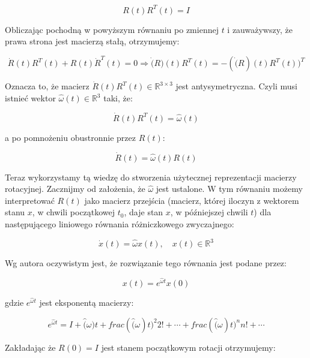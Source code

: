 \documentclass[a4paper,12pt]{article}
\newcommand{\RR}{\mathbb{R}^3}
\newcommand{\RRR}{\mathbb{R}^{3 \times 3}}
\begin{document}
\begin{equation}
R(t)R^T(t)=I
\end{equation}

Obliczając pochodną w powyższym równaniu po zmiennej $t$ i zauważywszy, że prawa strona jest macierzą stałą, otrzymujemy:

\begin{equation}
\dot{R}(t)R^T(t) + R(t)\dot{R}^T(t)=0 \Rightarrow \dot(R)(t)R^T(t)=-(\dot(R)(t)R^T(t))^T
\end{equation}

Oznacza to, że macierz $\dot{R}(t)R^T(t) \in \RRR$ jest antysymetryczna. Czyli musi istnieć wektor $\hat{\omega}(t) \in \RR$ taki, że:

\begin{equation}
\dot{R}(t)R^T(t) = \hat{\omega}(t)
\end{equation}

\noindent a po pomnożeniu obustronnie przez $R(t)$:

\begin{equation}
\dot{R}(t) = \hat{\omega}(t)R(t)
\end{equation}

Teraz wykorzystamy tą wiedzę do stworzenia użytecznej reprezentacji macierzy rotacyjnej. Zacznijmy od założenia, że $\hat{\omega}$ jest ustalone. W tym równaniu możemy interpretować $R(t)$ jako macierz przejścia (macierz, której iloczyn z wektorem stanu $x$, w chwili początkowej $t_0$, daje stan $x$, w późniejszej chwili $t$) dla następującego liniowego równania różniczkowego zwyczajnego:

\begin{equation}
\dot{x}(t) = \hat{\omega}x(t), \quad x(t) \in \RR
\end{equation}

\noindent Wg autora oczywistym jest, że rozwiązanie tego równania jest podane przez:

\begin{equation}
x(t) = e^{\hat{\omega}t}x(0)
\end{equation}

\noindent gdzie $e^{\hat{\omega}t}$ jest eksponentą macierzy:

\begin{equation}
e^{\hat{\omega}t} = I + \hat(\omega)t + frac{(\hat(\omega)t)^2}{2!} + \cdots + frac{(\hat(\omega)t)^n}{n!} + \cdots
\end{equation}

Zakładając że $R(0)=I$ jest stanem początkowym rotacji otrzymujemy:
\end{document}
